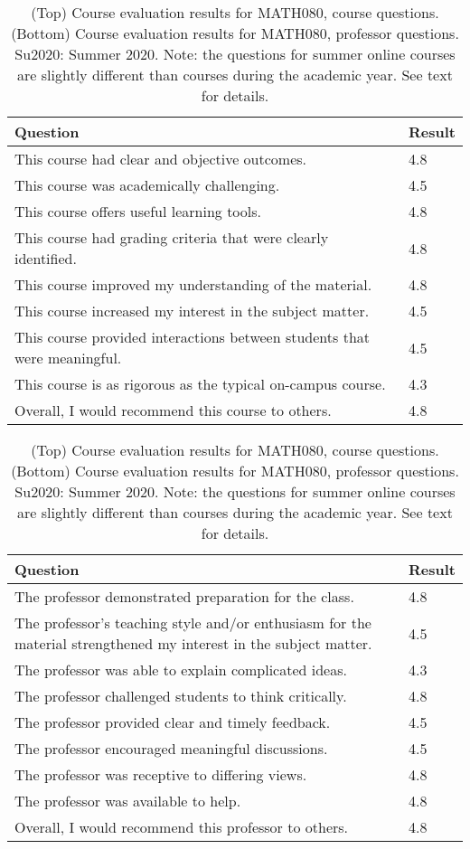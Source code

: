 \documentclass[../../main.tex]{subfiles}
\begin{document}
\begin{table}
\footnotesize
\centering
\begin{tabular}{| p{6cm} | p{1cm} |}
\hline
\hline
Question & Result \\ \hline
This course had clear and objective outcomes. & 4.8 \\ \hline
This course was academically challenging. & 4.5 \\ \hline
This course offers useful learning tools. & 4.8 \\ \hline
This course had grading criteria that were clearly identified. & 4.8 \\ \hline
This course improved my understanding of the material. & 4.8 \\ \hline
This course increased my interest in the subject matter. & 4.5 \\ \hline
This course provided interactions between students that were meaningful. & 4.5 \\ \hline
This course is as rigorous as the typical on-campus course. & 4.3 \\ \hline
Overall, I would recommend this course to others. & 4.8 \\ \hline
\hline
\end{tabular}
\begin{tabular}{| p{6cm} | p{1cm} |}
\hline
\hline
Question & Result \\ \hline
The professor demonstrated preparation for the class. & 4.8 \\ \hline
The professor's teaching style and/or enthusiasm for the material strengthened my interest in the subject matter. & 4.5 \\ \hline
The professor was able to explain complicated ideas. & 4.3 \\ \hline
The professor challenged students to think critically. & 4.8 \\ \hline
The professor provided clear and timely feedback. & 4.5 \\ \hline
The professor encouraged meaningful discussions. & 4.5 \\ \hline
The professor was receptive to differing views. & 4.8 \\ \hline
The professor was available to help. & 4.8 \\ \hline
Overall, I would recommend this professor to others. & 4.8 \\ \hline
\hline
\end{tabular}
\caption{\label{tab:eval_080} (Top) Course evaluation results for MATH080, course questions.  (Bottom) Course evaluation results for MATH080, professor questions. Su2020: Summer 2020.  Note: the questions for summer online courses are slightly different than courses during the academic year.  See text for details.}
\end{table}
\end{document}
